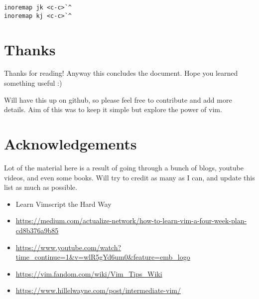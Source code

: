 \documentclass[12pt, letterpaper]{article}
\begin{document}
\begin{verbatim}
inoremap jk <c-c>`^
inoremap kj <c-c>`^
\end{verbatim}

\section{Thanks}
Thanks for reading! Anyway this concludes the document. Hope you learned
something useful :)

Will have this up on github, so please feel free to contribute and add more
details. Aim of this was to keep it simple but explore the power of vim.

\section{Acknowledgements}
Lot of the material here is a result of going through a bunch of blogs, youtube
videos, and even some books. Will try to credit as many as I can, and update
this list as much as possible.

\begin{itemize}
    \item Learn Vimscript the Hard Way
    \item
        \url{https://medium.com/actualize-network/how-to-learn-vim-a-four-week-plan-cd8b376a9b85}
    \item
        \url{https://www.youtube.com/watch?time_continue=1&v=wlR5gYd6um0&feature=emb_logo}
    \item \url{https://vim.fandom.com/wiki/Vim_Tips_Wiki}
    \item \url{https://www.hillelwayne.com/post/intermediate-vim/}
\end{itemize}
\end{document}
